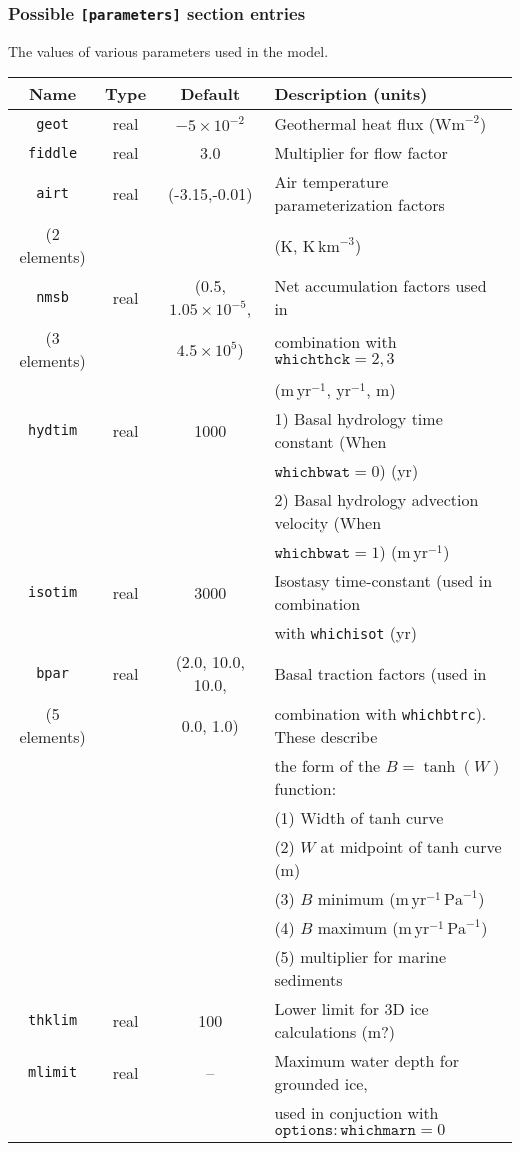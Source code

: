 \subsubsection{Possible \texttt{[parameters]} section entries}
%
The values of various parameters used in the model.
%
\begin{center}
\begin{tabular}{|c|c|c|l|}
\hline
Name & Type & Default & Description (units)\\
\hline
\hline
\texttt{geot} & real & $-5\times 10^{-2}$ & Geothermal heat flux
($\mathrm{Wm}^{-2}$) \\
\hline
\texttt{fiddle} & real & 3.0 & Multiplier for flow factor \\
\hline
\texttt{airt} & real & (-3.15,-0.01) & Air temperature parameterization
factors \\
(2 elements)& & & (K, $\mathrm{K}\,\mathrm{km}^{-3}$) \\
\hline
\texttt{nmsb} & real & (0.5, $1.05\times 10^{-5}$,  & Net accumulation
factors used in \\
(3 elements) & & $4.5\times 10^{5}$) & combination with $\mathtt{whichthck}=2,3$ \\
 & & & ($\mathrm{m}\,\mathrm{yr}^{-1}$, $\mathrm{yr}^{-1}$, m) \\
\hline
\texttt{hydtim} & real & 1000 & 1) Basal hydrology time constant (When \\
 & & & $\mathtt{whichbwat}=0$) (yr)\\
 & & & 2) Basal hydrology advection velocity (When \\
 & & & $\mathtt{whichbwat}=1$) ($\mathrm{m}\,\mathrm{yr}^{-1}$)\\
\hline
\texttt{isotim} & real & 3000 & Isostasy time-constant (used in combination \\
 & & & with \texttt{whichisot} (yr) \\
\hline 
\texttt{bpar}  & real & (2.0, 10.0, 10.0, & Basal traction factors (used in \\
 (5 elements)& & 0.0, 1.0) & combination with \texttt{whichbtrc}). These describe \\
 & & & the form of the $B=\tanh(W)$ function: \\
 & & & (1) Width of tanh curve \\
 & & & (2) $W$ at midpoint of tanh curve (m) \\
 & & & (3) $B$ minimum ($\mathrm{m}\,\mathrm{yr}^{-1}\,\mathrm{Pa}^{-1}$) \\
 & & & (4) $B$ maximum ($\mathrm{m}\,\mathrm{yr}^{-1}\,\mathrm{Pa}^{-1}$) \\
 & & & (5) multiplier for marine sediments \\
\hline
\texttt{thklim} & real & 100 & Lower limit for 3D ice calculations (m?) \\
\hline
\texttt{mlimit} & real & -- & Maximum water depth for grounded ice, \\
 & & & used in conjuction with $\mathtt{options:whichmarn}=0$\\
\hline
\end{tabular}
\end{center}
%
